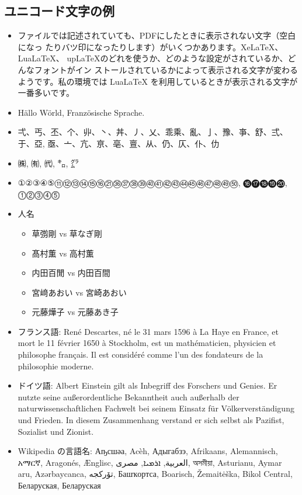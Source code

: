 \subsection{ユニコード文字の例}

\begin{itemize}
 \item ファイルでは記述されていても、PDFにしたときに表示されない文字（空白になっ
       たりバツ印になったりします）がいくつかあります。XeLaTeX、LuaLaTeX、
       upLaTeXのどれを使うか、どのような設定がされているか、どんなフォントがイン
       ストールされているかによって表示される文字が変わるようです。私の環境では
       LuaLaTeX を利用しているときが表示される文字が一番多いです。
 \item Hällo Wörld, Französische Sprache.
 \item 弌、丐、丕、个、丱、丶、丼、丿、乂、乖乘、亂、亅、豫、亊、舒、弍、于、亞,
       亟、亠、亢、亰、亳、亶、从、仍、仄、仆、仂
 \item ㈱, ㈲, ㈹, ㌔, ㌘
 \item ①②③④⑤⑪⑫⑬⑭⑮⑯㉑㊱㊲㊳㊴㊵㊶㊷㊸㊹㊺㊻㊼㊽㊾㊿, ⓰⓱⓲⓳⓴, ⓵⓶⓷⓸⓹
 \item 人名
       \begin{itemize}
	\item 草彅剛 vs 草なぎ剛
	\item 髙村薫 vs 高村薫
	\item 内田百閒 vs 内田百間
	\item 宮﨑あおい vs 宮崎あおい
	\item 元藤燁子 vs 元藤あき子
       \end{itemize}
 \item フランス語: René Descartes, né le 31 mars 1596 à La Haye en France, et
       mort le 11 février 1650 à Stockholm, est un mathématicien, physicien et
       philosophe français. Il est considéré comme l'un des fondateurs de la
       philosophie moderne.
 \item ドイツ語: Albert Einstein gilt als Inbegriff des Forschers und Genies. Er
       nutzte seine außerordentliche Bekanntheit auch außerhalb der
       naturwissenschaftlichen Fachwelt bei seinem Einsatz für
       Völkerverständigung und Frieden. In diesem Zusammenhang verstand er sich
       selbst als Pazifist, Sozialist und Zionist. 
 \item Wikipedia の言語名: Аҧсшәа, Acèh, Адыгабзэ, Afrikaans,
       Alemannisch, አማርኛ, Aragonés, Ænglisc, العربية, ܐܪܡܝܐ, مصرى, অসমীয়া,
       Asturianu, Aymar aru, Azərbaycanca, تۆرکجه, Башҡортса, Boarisch,
       Žemaitėška, Bikol Central, Беларуская, Беларуская

\end{itemize}
